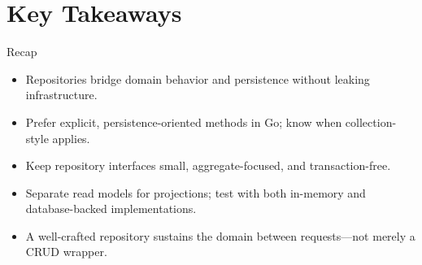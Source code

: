 \documentclass{beamer}
\begin{document}
\section{Key Takeaways}

\begin{frame}{Recap}
  \begin{itemize}
    \item Repositories bridge domain behavior and persistence without leaking infrastructure.
    \item Prefer explicit, persistence-oriented methods in Go; know when collection-style applies.
    \item Keep repository interfaces small, aggregate-focused, and transaction-free.
    \item Separate read models for projections; test with both in-memory and database-backed implementations.
    \item A well-crafted repository sustains the domain between requests—not merely a CRUD wrapper.
  \end{itemize}
\end{frame}
\end{document}
